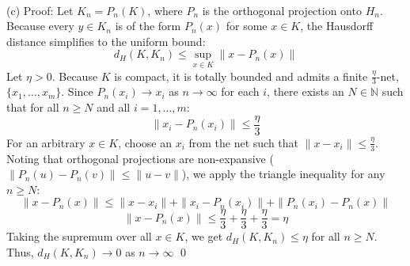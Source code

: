 \documentclass{article}
\begin{document}
\\
(c) Proof: Let $K_n = P_n(K)$, where $P_n$ is the orthogonal projection onto $H_n$. Because every $y \in K_n$ is of the form $P_n(x)$ for some $x \in K$, the Hausdorff distance simplifies to the uniform bound:$$d_H(K, K_n) \leq \sup_{x \in K} \|x - P_n(x)\|$$Let $\eta > 0$. Because $K$ is compact, it is totally bounded and admits a finite $\frac{\eta}{3}$-net, $\{x_1, \dots, x_m\}$. Since $P_n(x_i) \to x_i$ as $n \to \infty$ for each $i$, there exists an $N \in \mathbb{N}$ such that for all $n \geq N$ and all $i = 1, \dots, m$:$$\|x_i - P_n(x_i)\| \leq \frac{\eta}{3}$$For an arbitrary $x \in K$, choose an $x_i$ from the net such that $\|x - x_i\| \leq \frac{\eta}{3}$. Noting that orthogonal projections are non-expansive ($\|P_n(u) - P_n(v)\| \leq \|u - v\|$), we apply the triangle inequality for any $n \geq N$:$$\|x - P_n(x)\| \leq \|x - x_i\| + \|x_i - P_n(x_i)\| + \|P_n(x_i) - P_n(x)\|$$$$\|x - P_n(x)\| \leq \frac{\eta}{3} + \frac{\eta}{3} + \frac{\eta}{3} = \eta$$Taking the supremum over all $x \in K$, we get $d_H(K, K_n) \leq \eta$ for all $n \geq N$. Thus, $d_H(K, K_n) \to 0$ as $n \to \infty$
\qed
\end{document}
